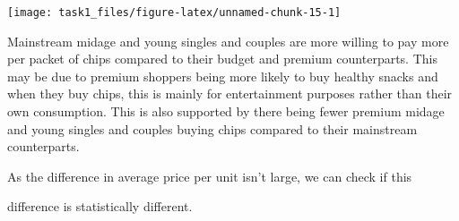 \documentclass[
]{article}
\begin{document}
\begin{center}\texttt{[image: task1\_files/figure-latex/unnamed-chunk-15-1]} \end{center}

Mainstream midage and young singles and couples are more willing to pay
more per packet of chips compared to their budget and premium
counterparts. This may be due to premium shoppers being more likely to
buy healthy snacks and when they buy chips, this is mainly for
entertainment purposes rather than their own consumption. This is also
supported by there being fewer premium midage and young singles and
couples buying chips compared to their mainstream counterparts.

As the difference in average price per unit isn't large, we can check if
this

difference is statistically different.
\end{document}
